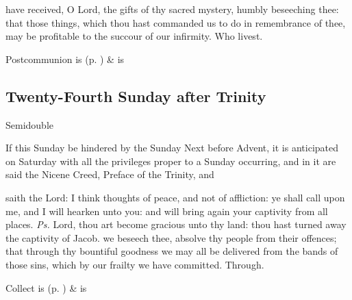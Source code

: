 
\postcommunion
{} have received, O Lord, the gifts of thy sacred mystery, humbly beseeching thee: that those things, which thou hast commanded us to do in remembrance of thee, may be profitable to the succour of our infirmity. Who livest.
\begin{rubric}
     Postcommunion is  (p. \pageref{SPSaints}) \&  is 
\end{rubric}


\clearpage
\subsection{Twenty-Fourth Sunday after Trinity}
\begin{inhead}
{Semidouble}
\end{inhead}
\begin{rubric}
If this Sunday be hindered by the Sunday Next before Advent, it is anticipated on Saturday with all the privileges proper to a Sunday occurring, and in it are said  the Nicene Creed, Preface of the Trinity, and 
\end{rubric}


\introit
{} saith the Lord: I think thoughts of peace, and not of affliction: ye shall call upon me, and I will hearken unto you: and will bring again your captivity from all places. \textit{Ps.} Lord, thou art become gracious unto thy land: thou hast turned away the captivity of Jacob.
\collect
{} we beseech thee, absolve thy people from their offences; that through thy bountiful goodness we may all be delivered from the bands of those sins, which by our frailty we have committed. Through.
\begin{rubric}
     Collect is  (p. \pageref{SPSaints}) \&  is 
\end{rubric}

